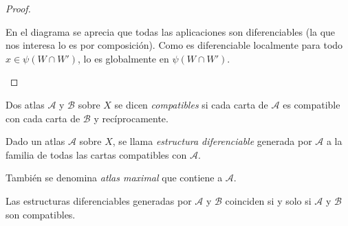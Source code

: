 \documentclass[../VD.tex]{subfiles}
\begin{document}
\begin{proof}
\begin{subproof}
    \begin{figure}[h]
      \centering
    \end{figure}

    En el diagrama se aprecia que todas las aplicaciones son diferenciables (la
    que nos interesa lo es por composición). Como es diferenciable localmente
    para todo \(x \in \psi(W \cap W')\), lo es globalmente en \(\psi(W \cap W')\).
  \end{subproof}
\end{proof}

\begin{definition}
  Dos atlas \(\mathcal{A}\) y \(\mathcal{B}\) sobre \(X\) se dicen
  \emph{compatibles} si cada carta de \(\mathcal{A}\) es compatible con cada
  carta de \(\mathcal{B}\) y recíprocamente.
\end{definition}

\begin{definition}
  Dado un atlas \(\mathcal{A}\) sobre \(X\), se llama \emph{estructura
    diferenciable} generada por \(\mathcal{A}\) a la familia de todas las cartas
  compatibles con \(\mathcal{A}\).

  También se denomina \emph{atlas maximal} que contiene a \(\mathcal{A}\).
\end{definition}

\begin{lemma}
  Las estructuras diferenciables generadas por \(\mathcal{A}\) y \(\mathcal{B}\)
  coinciden si y solo si \(\mathcal{A}\) y \(\mathcal{B}\) son compatibles.
\end{lemma}
\end{document}
